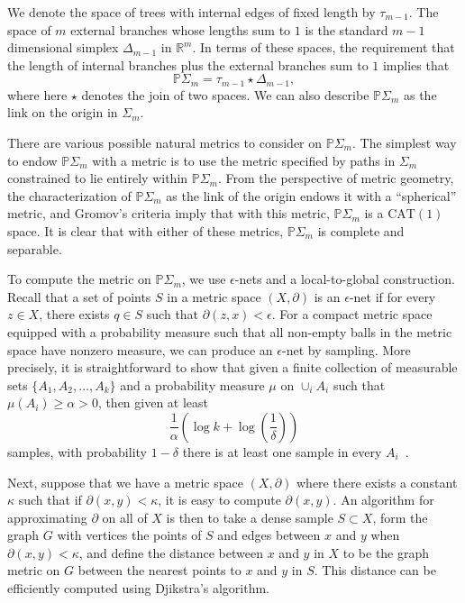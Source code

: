 \documentclass[a4paper,11pt]{article}
\newcommand{\CAT}{\textrm{CAT}}
\begin{document}
We denote the space of trees with internal edges of fixed length by
$\tau_{m-1}$.  The space of $m$ external branches whose lengths sum to
$1$ is the standard $m-1$ dimensional simplex $\Delta_{m-1}$ in
$\mathbb{R}^m$.  In terms of these spaces, the requirement that the
length of internal branches plus the external branches sum to $1$
implies that
\[\mathbb{P}\Sigma_m = \tau_{m-1} \star \Delta_{m-1},\]
where here $\star$ denotes the join of two spaces.  We can also
describe $\mathbb{P}\Sigma_m$ as the link on the origin in $\Sigma_m$.

There are various possible natural metrics to consider on $\mathbb{P}
\Sigma_m$.  The simplest way to endow $\mathbb{P} \Sigma_m$ with a
metric is to use the metric specified by paths in $\Sigma_m$
constrained to lie entirely within $\mathbb{P} \Sigma_m$.  From the
perspective of metric geometry, the characterization of $\mathbb{P}
\Sigma_m$ as the link of the origin endows it with a ``spherical''
metric, and Gromov's criteria imply that with this metric, $\mathbb{P}
\Sigma_m$ is a $\CAT(1)$ space.  It is clear that with either of these
metrics, $\mathbb{P} \Sigma_m$ is complete and separable.

To compute the metric on $\mathbb{P}\Sigma_m$, we use $\epsilon$-nets
and a local-to-global construction.  Recall that a set of points $S$
in a metric space $(X,\partial)$ is an $\epsilon$-net if for every $z
\in X$, there exists $q \in S$ such that $\partial(z,x) < \epsilon$.
For a compact metric space equipped with a probability measure such
that all non-empty balls in the metric space have nonzero measure, we
can produce an $\epsilon$-net by sampling.  More precisely, it is
straightforward to show that given a finite collection of measurable
sets $\{A_1, A_2, \ldots, A_k\}$ and a probability measure $\mu$ on
$\cup_i A_i$ such that $\mu(A_i) \geq \alpha > 0$, then given at least
\[
\frac{1}{\alpha}\left(\log k + \log(\frac{1}{\delta})\right)
\]
samples, with probability $1-\delta$ there is at least one sample in
every $A_i$~\cite[5.1]{niyogi2008finding}.

Next, suppose that we have a metric space $(X,\partial)$ where there
exists a constant $\kappa$ such that if $\partial(x,y) < \kappa$, it
is easy to compute $\partial(x,y)$.  An algorithm for approximating
$\partial$ on all of $X$ is then to take a dense sample $S \subset X$,
form the graph $G$ with vertices the points of $S$ and edges between
$x$ and $y$ when $\partial(x,y) < \kappa$, and define the distance
between $x$ and $y$ in $X$ to be the graph metric on $G$ between the
nearest points to $x$ and $y$ in $S$.  This distance can be
efficiently computed using Djikstra's algorithm.
\end{document}
